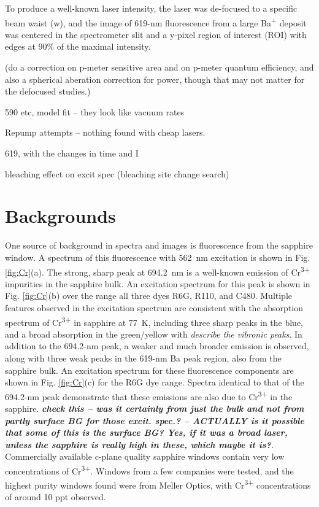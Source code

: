 To produce a well-known laser intensity, the laser was de-focused to a specific beam waist (w), and the image of 619-nm fluorescence from a large Ba\textsuperscript{+} deposit was centered in the spectrometer slit and a y-pixel region of interest (ROI) with edges at 90\% of the maximal intensity.

({\color{red}do a correction on p-meter sensitive area and on p-meter quantum efficiency, and also a spherical aberation correction for power, though that may not matter for the defocused studies.})

590 etc, model fit -- they look like vacuum rates


Repump attempts -- nothing found with cheap lasers.

619, with the changes in time and I

bleaching effect on excit spec (bleaching site change search)

\section{Backgrounds}
\label{sec:bgs}

One source of background in spectra and images is fluorescence from the sapphire window.  A spectrum of this fluorescence with 562~nm excitation is shown in Fig. \ref{fig:Cr}(a).  The strong, sharp peak at {\color{red}694.2~nm} is a well-known emission of Cr\textsuperscript{3+} impurities in the sapphire bulk.  An excitation spectrum for this peak is shown in Fig. \ref{fig:Cr}(b) over the range all three dyes R6G, R110, and C480.  Multiple features observed in the excitation spectrum are consistent with the absorption spectrum of Cr\textsuperscript{3+} in sapphire at 77~K, including three sharp peaks in the blue, and a broad absorption in the green/yellow with \emph{\color{gray}describe the vibronic peaks}.  In addition to the {\color{red}694.2-nm peak}, a weaker and much broader emission is observed, along with three weak peaks in the 619-nm Ba peak region, also from the sapphire bulk.  An excitation spectrum for these fluorescence components are shown in Fig. \ref{fig:Cr}(c) for the R6G dye range.  Spectra identical to that of the {\color{red}694.2-nm} peak demonstrate that these emissions are also due to Cr\textsuperscript{3+} in the sapphire.  \emph{\color{gray}\textbf{check this -- was it certainly from just the bulk and not from partly surface BG for those excit. spec.? -- ACTUALLY is it possible that some of this is the surface BG?  Yes, if it was a broad laser, unless the sapphire is really high in these, which maybe it is?}.}  Commercially available c-plane quality sapphire windows contain very low concentrations of Cr\textsuperscript{3+}.  Windows from a few companies were tested, and the highest purity windows found were from Meller Optics, with Cr\textsuperscript{3+} concentrations of around {\color{red}10 ppt} observed.

